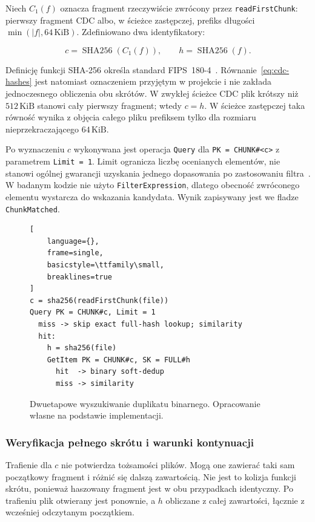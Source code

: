 Niech \(C_1(f)\) oznacza fragment rzeczywiście zwrócony przez
\texttt{readFirstChunk}: pierwszy fragment CDC albo, w ścieżce
zastępczej, prefiks długości \(\min(|f|,64\,\mathrm{KiB})\).
Zdefiniowano dwa identyfikatory:

\begin{equation}
\label{eq:cdc-hashes}
c=\operatorname{SHA256}\!\left(C_1(f)\right),
\qquad
h=\operatorname{SHA256}(f).
\end{equation}

Definicję funkcji SHA-256 określa standard
FIPS~180-4~\cite{shs2015}.
Równanie~\eqref{eq:cdc-hashes} jest natomiast oznaczeniem przyjętym
w projekcie i nie zakłada jednoczesnego obliczenia obu skrótów.
W zwykłej ścieżce CDC plik krótszy niż \(512\,\mathrm{KiB}\)
stanowi cały pierwszy fragment; wtedy \(c=h\).
W ścieżce zastępczej taka równość wynika z objęcia całego pliku
prefiksem tylko dla rozmiaru nieprzekraczającego \(64\,\mathrm{KiB}\).

Po wyznaczeniu \(c\) wykonywana jest operacja \texttt{Query}
dla \texttt{PK = CHUNK\#<c>} z parametrem \texttt{Limit = 1}.
Limit ogranicza liczbę ocenianych elementów, nie stanowi ogólnej
gwarancji uzyskania jednego dopasowania po zastosowaniu
filtra~\cite{awsQuery}.
W badanym kodzie nie użyto \texttt{FilterExpression}, dlatego
obecność zwróconego elementu wystarcza do wskazania kandydata.
Wynik zapisywany jest we fladze \texttt{ChunkMatched}.

\begin{figure}[!htbp]
\centering
\begin{lstlisting}[
    language={},
    frame=single,
    basicstyle=\ttfamily\small,
    breaklines=true
]
c = sha256(readFirstChunk(file))
Query PK = CHUNK#c, Limit = 1
  miss -> skip exact full-hash lookup; similarity
  hit:
    h = sha256(file)
    GetItem PK = CHUNK#c, SK = FULL#h
      hit  -> binary soft-dedup
      miss -> similarity
\end{lstlisting}
\caption{Dwuetapowe wyszukiwanie duplikatu binarnego.
Opracowanie własne na podstawie implementacji.}
\label{fig:cdc-lookup-algo}
\end{figure}

\subsubsection{Weryfikacja pełnego skrótu i warunki kontynuacji}
\label{subsubsec:potok-full-hash}

Trafienie dla \(c\) nie potwierdza tożsamości plików.
Mogą one zawierać taki sam początkowy fragment i różnić się dalszą
zawartością. Nie jest to kolizja funkcji skrótu, ponieważ haszowany
fragment jest w obu przypadkach identyczny.
Po trafieniu plik otwierany jest ponownie, a \(h\) obliczane
z całej zawartości, łącznie z wcześniej odczytanym początkiem.

